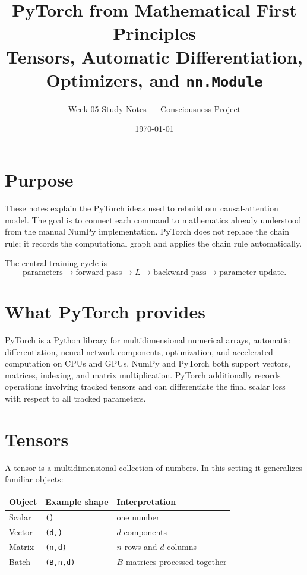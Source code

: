 \documentclass[11pt]{article}
\title{PyTorch from Mathematical First Principles\\
\large Tensors, Automatic Differentiation, Optimizers, and \texttt{nn.Module}}
\author{Week 05 Study Notes --- Consciousness Project}
\date{\today}
\begin{document}
\maketitle
\tableofcontents
\newpage

\section{Purpose}

These notes explain the PyTorch ideas used to rebuild our causal-attention model. The goal is to connect
each command to mathematics already understood from the manual NumPy implementation. PyTorch does not
replace the chain rule; it records the computational graph and applies the chain rule automatically.

The central training cycle is
\[
\boxed{
\text{parameters}\longrightarrow\text{forward pass}\longrightarrow L
\longrightarrow\text{backward pass}\longrightarrow\text{parameter update}.
}
\]

\section{What PyTorch provides}

PyTorch is a Python library for multidimensional numerical arrays, automatic differentiation, neural-network
components, optimization, and accelerated computation on CPUs and GPUs. NumPy and PyTorch both support
vectors, matrices, indexing, and matrix multiplication. PyTorch additionally records operations involving
tracked tensors and can differentiate the final scalar loss with respect to all tracked parameters.

\section{Tensors}

A tensor is a multidimensional collection of numbers. In this setting it generalizes familiar objects:

\begin{center}
\begin{tabular}{lll}
\toprule
Object & Example shape & Interpretation\\
\midrule
Scalar & \texttt{()} & one number\\
Vector & \texttt{(d,)} & $d$ components\\
Matrix & \texttt{(n,d)} & $n$ rows and $d$ columns\\
Batch & \texttt{(B,n,d)} & $B$ matrices processed together\\
\bottomrule
\end{tabular}
\end{center}
\end{document}
